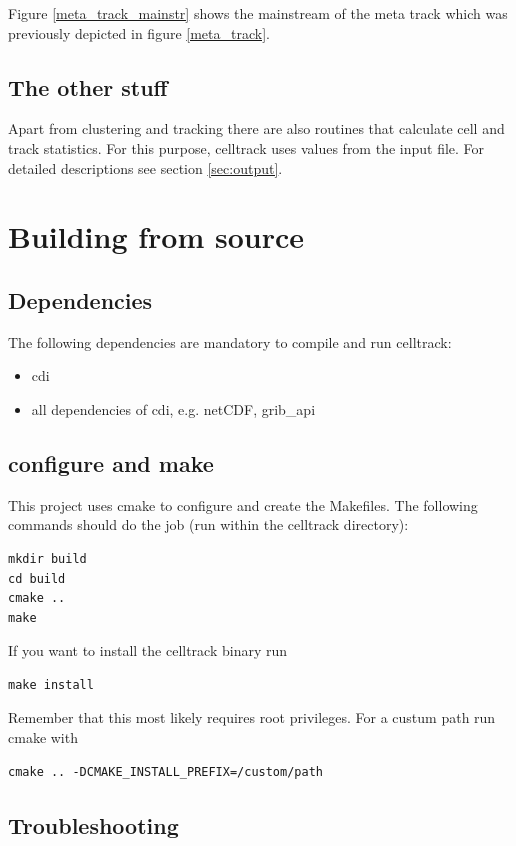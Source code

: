 \documentclass{scrartcl}
\begin{document}
Figure \ref{meta_track_mainstr} shows the mainstream of the meta track which was previously depicted in figure \ref{meta_track}.  

\subsection{The other stuff}
Apart from clustering and tracking there are also routines that calculate cell and track statistics. For this purpose, celltrack uses values from the input file. For detailed descriptions see section \ref{sec:output}.

\section{Building from source}
\subsection{Dependencies}
The following dependencies are mandatory to compile and run celltrack:
\begin{itemize}
	\item cdi
	\item all dependencies of cdi, e.g. netCDF, grib\_api
\end{itemize}

\subsection{configure and make}
This project uses cmake to configure and create the Makefiles. The following commands should do the job (run within the celltrack directory):
\begin{verbatim}
mkdir build
cd build
cmake ..
make
\end{verbatim}
If you want to install the celltrack binary run
\begin{verbatim}
make install
\end{verbatim}
Remember that this most likely requires root privileges. For a custum path run cmake with 
\begin{verbatim}
cmake .. -DCMAKE_INSTALL_PREFIX=/custom/path
\end{verbatim}
\subsection{Troubleshooting}
\end{document}
